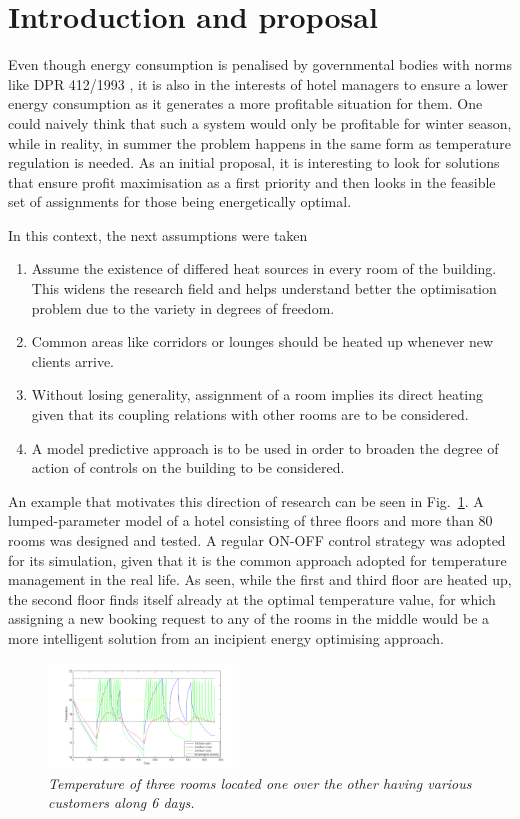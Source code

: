 \documentclass[letterpaper, 10 pt, conference]{ieeeconf}
\begin{document}
\section{Introduction and proposal} \label{intro}
Even though energy consumption is penalised by governmental bodies with norms like DPR 412/1993 \cite{normDPR}, it is also in the interests of hotel managers to ensure a lower energy consumption as it generates a more profitable situation for them. One could naively think that such a system would only be profitable for winter season, while in reality, in summer the problem happens in the same form as temperature regulation is needed. As an initial proposal, it is interesting to look for solutions that ensure profit maximisation as a first priority and then looks in the feasible set of assignments for those being energetically optimal.

In this context, the next assumptions were taken
\begin{enumerate}
	\item Assume the existence of differed heat sources in every room of the building. This widens the research field and helps understand better the optimisation problem due to the variety in degrees of freedom.
	\item Common areas like corridors or lounges should be heated up whenever new clients arrive. 
	\item Without losing generality, assignment of a room implies its direct heating given that its coupling relations with other rooms are to be considered.
	\item A model predictive approach is to be used in order to broaden the degree of action of controls on the building to be considered.
\end{enumerate}

An example that motivates this direction of research can be seen in Fig.~\ref{figTemper_onoff}. A lumped-parameter model of a hotel consisting of three floors and more than 80 rooms was designed and tested. A regular ON-OFF control strategy was adopted for its simulation, given that it is the common approach adopted for temperature management in the real life. As seen, while the first and third floor  are heated up, the second floor finds itself already at the optimal temperature value, for which assigning a new booking request to any of the rooms in the middle would be a more intelligent solution from an incipient energy optimising approach.

\begin{figure}[htbp]
	\centering
	\includegraphics[width=0.45\textwidth, height=0.22\textwidth]{img/temperature_anal.png}
	\caption{\textit{Temperature of three rooms located one over the other having various customers along 6 days.}}
	\label{figTemper_onoff}
\end{figure}
\end{document}
